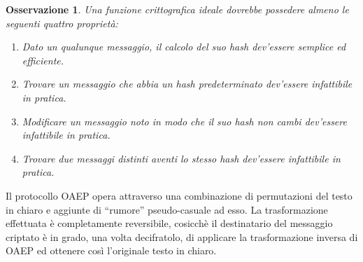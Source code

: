 \documentclass[pdflatex,11pt,a4paper,oneside]{article}
\newtheorem{remark}[TheoremLike]{Osservazione}
\begin{document}
\begin{remark}
Una funzione crittografica ideale dovrebbe possedere almeno le seguenti
quattro propriet\`a:
\begin{enumerate}
\item
  Dato un qualunque messaggio, il calcolo del suo hash dev'essere
  semplice ed efficiente.
\item
  Trovare un messaggio che abbia un hash predeterminato dev'essere
  infattibile in pratica.
\item
  Modificare un messaggio noto in modo che il suo hash non cambi
  dev'essere infattibile in pratica.
\item
  Trovare due messaggi distinti aventi lo stesso hash dev'essere
  infattibile in pratica.
\end{enumerate}
\end{remark}

\smallskip\noindent
Il protocollo OAEP opera attraverso una combinazione di permutazioni del
testo in chiaro e aggiunte di ``rumore'' pseudo-casuale ad esso.  La
trasformazione effettuata \`e completamente reversibile, cosicch\`e il
destinatario del messaggio criptato \`e in grado, una volta decifratolo,
di applicare la trasformazione inversa di OAEP ed ottenere cos\`i
l'originale testo in chiaro.
\end{document}

